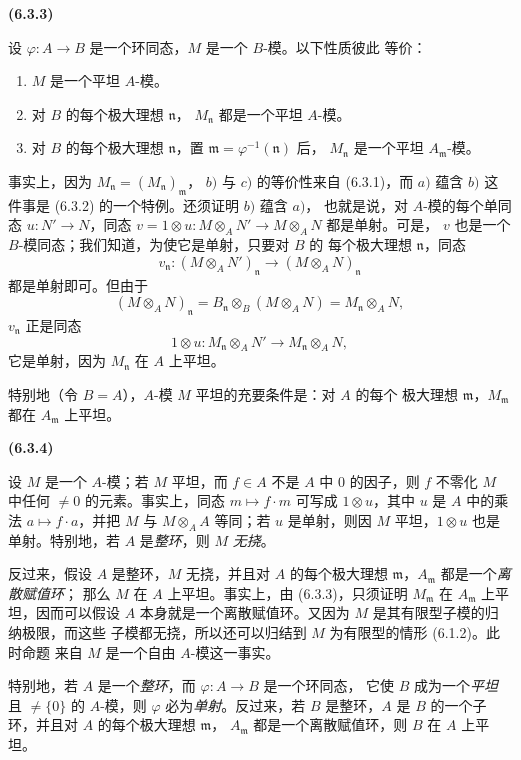 \documentclass[UTF8,fontset=none,11pt,oneside,openany]{ctexbook}
\newenvironment{env}[1][]{%
  \par\medskip\noindent\textbf{(#1)}\ %
}{\par}
\newcommand{\oldpage}[2][]{%
  \hypertarget{ega-source-page-#1-#2}{}%
  \marginnote{\scriptsize\textbf{#1}~|~#2}\ignorespaces}
\let\EGAOriginalLabel\label
\renewcommand{\label}[1]{\phantomsection\EGAOriginalLabel{#1}}
\begin{document}
\begin{env}[6.3.3]
\label{0.6.3.3-fr}
设 $\varphi:A\to B$ 是一个环同态，$M$ 是一个 $B$-模。以下性质彼此
等价：
\begin{enumerate}
  \item[$a)$] $M$ 是一个平坦 $A$-模。
  \item[$b)$] 对 $B$ 的每个极大理想 $\mathfrak{n}$，
    $M_\mathfrak{n}$ 都是一个平坦 $A$-模。
  \item[$c)$] 对 $B$ 的每个极大理想 $\mathfrak{n}$，置
    $\mathfrak{m}=\varphi^{-1}(\mathfrak{n})$ 后，
    $M_\mathfrak{n}$ 是一个平坦 $A_\mathfrak{m}$-模。
\end{enumerate}

事实上，因为 $M_\mathfrak{n}=(M_\mathfrak{n})_\mathfrak{m}$，
$b)$ 与 $c)$ 的等价性来自 (6.3.1)，而 $a)$ 蕴含 $b)$ 这件事是
(6.3.2) 的一个特例。还须证明 $b)$ 蕴含 $a)$，
\oldpage[0\textsubscript{I}]{57}
也就是说，对 $A$-模的每个单同态 $u:N'\to N$，同态
$v=1\otimes u:M\otimes_A N'\to M\otimes_A N$ 都是单射。可是，
$v$ 也是一个 $B$-模同态；我们知道，为使它是单射，只要对 $B$ 的
每个极大理想 $\mathfrak{n}$，同态
\[
  v_\mathfrak{n}:(M\otimes_A N')_\mathfrak{n}
  \longrightarrow(M\otimes_A N)_\mathfrak{n}
\]
都是单射即可。但由于
\[
  (M\otimes_A N)_\mathfrak{n}
  =B_\mathfrak{n}\otimes_B(M\otimes_A N)
  =M_\mathfrak{n}\otimes_A N,
\]
$v_\mathfrak{n}$ 正是同态
\[
  1\otimes u:M_\mathfrak{n}\otimes_A N'
  \longrightarrow M_\mathfrak{n}\otimes_A N,
\]
它是单射，因为 $M_\mathfrak{n}$ 在 $A$ 上平坦。

特别地（令 $B=A$），$A$-模 $M$ 平坦的充要条件是：对 $A$ 的每个
极大理想 $\mathfrak{m}$，$M_\mathfrak{m}$ 都在
$A_\mathfrak{m}$ 上平坦。
\end{env}

\begin{env}[6.3.4]
\label{0.6.3.4-fr}
设 $M$ 是一个 $A$-模；若 $M$ 平坦，而 $f\in A$ 不是 $A$ 中
$0$ 的因子，则 $f$ 不零化 $M$ 中任何 $\neq0$ 的元素。事实上，同态
$m\mapsto f\cdot m$ 可写成 $1\otimes u$，其中 $u$ 是 $A$ 中的乘法
$a\mapsto f\cdot a$，并把 $M$ 与 $M\otimes_A A$ 等同；若 $u$
是单射，则因 $M$ 平坦，$1\otimes u$ 也是单射。特别地，若 $A$
是\emph{整环}，则 $M$ \emph{无挠}。

反过来，假设 $A$ 是整环，$M$ 无挠，并且对 $A$ 的每个极大理想
$\mathfrak{m}$，$A_\mathfrak{m}$ 都是一个\emph{离散赋值环}；
那么 $M$ 在 $A$ 上平坦。事实上，由 (6.3.3)，只须证明
$M_\mathfrak{m}$ 在 $A_\mathfrak{m}$ 上平坦，因而可以假设 $A$
本身就是一个离散赋值环。又因为 $M$ 是其有限型子模的归纳极限，而这些
子模都无挠，所以还可以归结到 $M$ 为有限型的情形 (6.1.2)。此时命题
来自 $M$ 是一个自由 $A$-模这一事实。

特别地，若 $A$ 是一个\emph{整环}，而 $\varphi:A\to B$ 是一个环同态，
它使 $B$ 成为一个\emph{平坦}且 $\neq\{0\}$ 的 $A$-模，则
$\varphi$ 必为\emph{单射}。反过来，若 $B$ 是整环，$A$ 是 $B$
的一个子环，并且对 $A$ 的每个极大理想 $\mathfrak{m}$，
$A_\mathfrak{m}$ 都是一个离散赋值环，则 $B$ 在 $A$ 上平坦。
\end{env}
\end{document}

